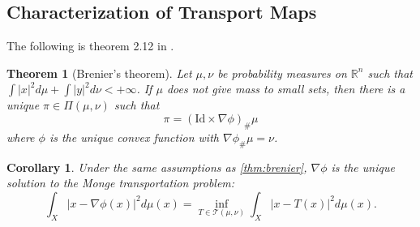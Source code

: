 \documentclass[12pt]{article}
\newcommand{\R}{\mathbb{R}}
\theoremstyle{plain}
\newtheorem{thm}{Theorem}[section]
\newtheorem{cor}{Corollary}[section]
\newtheorem{prop}{Proposition}[section]
\newtheorem{defn}{Definition}[section]
\numberwithin{equation}{section}
\begin{document}
\subsection{Characterization of Transport Maps}
The following is theorem 2.12 in \cite{villani}.
\begin{thm}[Brenier's theorem]\label{thm:brenier}
Let $\mu,\nu$ be probability measures on $\R^n$ such that $\int |x|^2 d\mu + \int |y|^2d\nu < +\infty$. If $\mu$ does not give mass to small sets, then there is a unique $\pi\in\Pi(\mu,\nu)$ such that 
\[\pi = (\text{Id}\times \nabla \phi)_\#\mu\]
where $\phi$ is the unique convex function with $\nabla\phi_\#\mu = \nu$.
\end{thm}
\begin{cor}\label{cor:transport}
  Under the same assumptions as \autoref{thm:brenier}, $\nabla\phi$ is the unique solution to the Monge transportation problem:
  \[\int_X|x-\nabla\phi(x)|^2d\mu(x) = \inf_{T\in\mathcal{T}(\mu,\nu)}\int_X|x-T(x)|^2d\mu(x).\]
\end{cor}

\end{document}

